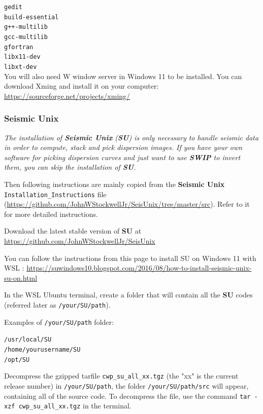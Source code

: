 \documentclass[twoside,a4paper]{article}
\def\SWIP{\textbf{SWIP}}
\def\SU{\textbf{SU}}
\def\SeismicUnix{\textbf{Seismic Unix}}
\begin{document}
\verb|gedit|\\
\verb|build-essential|\\
\verb|g++-multilib|\\
\verb|gcc-multilib|\\
\verb|gfortran|\\
\verb|libx11-dev|\\
\verb|libxt-dev|\\

You will also need W window server in Windows 11 to be installed. You can download Xming and install it on your computer:
\url{https://sourceforge.net/projects/xming/}

\subsubsection{Seismic Unix}
\label{subsec:WinSU}
\textit{The installation of {\SeismicUnix} ({\SU}) is only necessary to handle seismic data in order to compute, stack and pick dispersion images. If you have your own software for picking dispersion curves and just want to use {\SWIP} to invert them, you can skip the installation of {\SU}.}

Then following instructions are mainly copied from the {\SeismicUnix} \verb|Installation_Instructions| file (\url{https://github.com/JohnWStockwellJr/SeisUnix/tree/master/src}). Refer to it for more detailed instructions.

Download the latest stable version of {\SU} at \url{https://github.com/JohnWStockwellJr/SeisUnix}

You can follow the instructions from this page to install SU on Windows 11 with WSL :
\url{https://suwindows10.blogspot.com/2016/08/how-to-install-seismic-unix-su-on.html}

In the WSL Ubuntu terminal, create a folder that will contain all the {\SU} codes (referred later as \verb|/your/SU/path|).

Examples of \verb|/your/SU/path| folder:

\verb|/usr/local/SU|\\
\verb|/home/yourusername/SU|\\
\verb|/opt/SU|

Decompress the gzipped tarfile \verb|cwp_su_all_xx.tgz| (the "xx" is the current release number) in \verb|/your/SU/path|, the folder \verb|/your/SU/path/src| will appear, containing all of the source code. To decompress the file, use the command \verb|tar -xzf cwp_su_all_xx.tgz| in the terminal.
\end{document}
